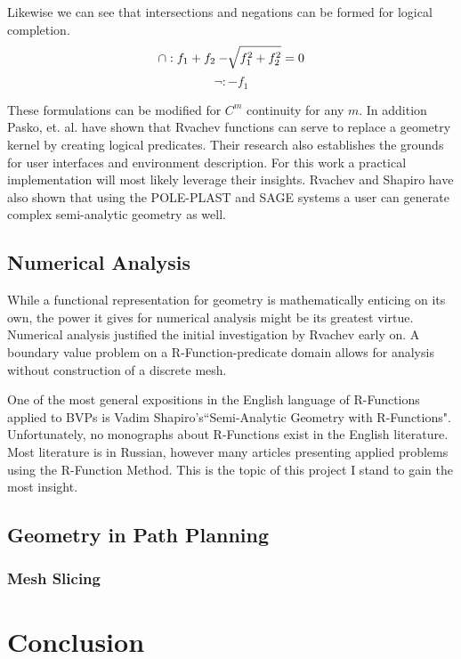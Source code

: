 \documentclass[a4paper]{article}
\begin{document}
Likewise we can see that intersections and negations can be formed for logical
completion.
\begin{equation*}
\cap : f_1 + f_2 - \sqrt[]{f_1^2 +f_2^2} =0 \\
\end{equation*}
\begin{equation*}
\neg : -f_1
\end{equation*}

These formulations can be modified for $C^m$ continuity for any $m$.
\cite{shapiro2007semi} In addition Pasko, et. al. have shown that Rvachev
functions can serve to replace a geometry kernel by creating logical
predicates. \cite{pasko1995function} Their research also establishes the
grounds for user interfaces and environment description. For this work a
practical implementation will most likely leverage their insights.
Rvachev and Shapiro have also shown that using the POLE-PLAST and SAGE
systems a user can generate complex semi-analytic geometry
as well.\cite{rvachev2000completeness} 
\subsection{Numerical Analysis}
While a functional representation for geometry is mathematically enticing on
its own, the power it gives for numerical analysis might be its greatest
virtue. Numerical analysis justified the initial investigation by Rvachev
early on. A boundary value problem on a R-Function-predicate domain allows
for analysis without construction of a discrete mesh.\cite{rvachev2000completeness}

One of the most general expositions in the English language of R-Functions
applied to BVPs is
Vadim Shapiro's``Semi-Analytic Geometry with R-Functions". \cite{shapiro2007semi}
Unfortunately, no monographs about R-Functions exist in the English literature.
Most literature is in Russian, however many articles presenting applied
problems using the R-Function Method. \cite{voron2010} This is the topic
of this project I stand to gain the most insight.


\subsection{Geometry in Path Planning}

\subsubsection{Mesh Slicing}


\section{Conclusion}



\end{document}
